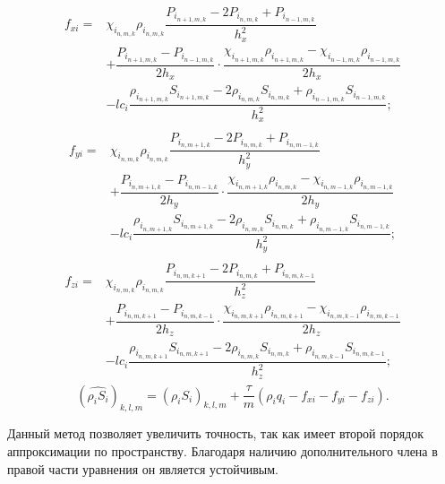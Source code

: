 \begin{eqnarray*}
  \begin{aligned}
    f_{xi} =& \chi_{i_{n,m,k}} \rho_{i_{n,m,k}} \dfrac{P_{i_{n+1,m,k}} - 2P_{i_{n,m,k}} + P_{i_{n-1,m,k}}}{h_x^2} \\
    &+ \dfrac{P_{i_{n+1,m,k}}-P_{i_{n-1,m,k}}}{2h_x} \cdot \dfrac{\chi_{i_{n+1,m,k}} \rho_{i_{n+1,m,k}}-\chi_{i_{n-1,m,k}} \rho_{i_{n-1,m,k}}}{2h_x} \\
    &- lc_i\dfrac{\rho_{i_{n+1,m,k}}S_{i_{n+1,m,k}} - 2\rho_{i_{n,m,k}}S_{i_{n,m,k}} + \rho_{i_{n-1,m,k}}S_{i_{n-1,m,k}}}{h_x^2};
  \end{aligned}
\end{eqnarray*}
\begin{eqnarray*}
  \begin{aligned}
    f_{yi} =& \chi_{i_{n,m,k}} \rho_{i_{n,m,k}} \dfrac{P_{i_{n,m+1,k}} - 2P_{i_{n,m,k}} + P_{i_{n,m-1,k}}}{h_y^2} \\
    &+ \dfrac{P_{i_{n,m+1,k}}-P_{i_{n,m-1,k}}}{2h_y} \cdot \dfrac{\chi_{i_{n,m+1,k}} \rho_{i_{n,m,k}}-\chi_{i_{n,m-1,k}} \rho_{i_{n,m-1,k}}}{2h_y} \\
    &- lc_i\dfrac{\rho_{i_{n,m+1,k}}S_{i_{n,m+1,k}} - 2\rho_{i_{n,m,k}}S_{i_{n,m,k}} + \rho_{i_{n,m-1,k}}S_{i_{n,m-1,k}}}{h_y^2};
  \end{aligned}
    \end{eqnarray*}
\begin{eqnarray*}
  \begin{aligned}
    f_{zi} =& \chi_{i_{n,m,k}} \rho_{i_{n,m,k}} \dfrac{P_{i_{n,m,k+1}} - 2P_{i_{n,m,k}} + P_{i_{n,m,k-1}}}{h_z^2} \\
    &+ \dfrac{P_{i_{n,m,k+1}}-P_{i_{n,m,k-1}}}{2h_z} \cdot \dfrac{\chi_{i_{n,m,k+1}} \rho_{i_{n,m,k+1}}-\chi_{i_{n,m,k-1}} \rho_{i_{n,m,k-1}}}{2h_z} \\
    &- lc_i\dfrac{\rho_{i_{n,m,k+1}}S_{i_{n,m,k+1}} - 2\rho_{i_{n,m,k}}S_{i_{n,m,k}} + \rho_{i_{n,m,k-1}}S_{i_{n,m,k-1}}}{h_z^2};
  \end{aligned}
\end{eqnarray*}
\begin{equation*}
    (\widehat{\rho_i S_i})_{k,l,m}=(\rho_i S_i)_{k,l,m}+\frac{\tau}{m}(\rho_i q_i - f_{xi} - f_{yi} - f_{zi}).
\end{equation*}

Данный метод позволяет увеличить точность, так как имеет второй порядок аппроксимации по пространству.
Благодаря наличию дополнительного члена в~ правой
части уравнения он является устойчивым.

